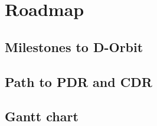 \chapter{Roadmap}
\label{ch:roadmap}
\section{Milestones to D-Orbit}

\section{Path to PDR and CDR}

\section{Gantt chart}
